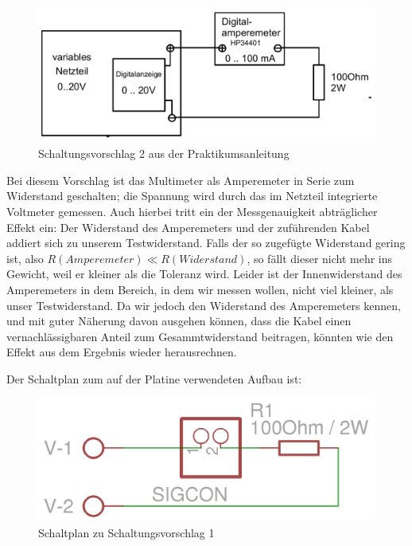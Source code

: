 \begin{figure}[H] %
	\centering
	\includegraphics[width=\linewidth]{versuch1/v1_1_Schaltungsvorschlag2}
	\caption{Schaltungsvorschlag 2 aus der Praktikumsanleitung}
\end{figure}
Bei diesem Vorschlag ist das Multimeter als Amperemeter in Serie zum Widerstand geschalten; die Spannung wird durch das im Netzteil integrierte Voltmeter gemessen. Auch hierbei tritt ein der Messgenauigkeit abträglicher Effekt ein: Der Widerstand des Amperemeters und der zuführenden Kabel addiert sich zu unserem Testwiderstand.
Falls der so zugefügte Widerstand gering ist, also $R(Amperemeter) \ll R(Widerstand)$, so fällt dieser nicht mehr ins Gewicht, weil er kleiner als die Toleranz wird. Leider ist der Innenwiderstand des Amperemeters in dem Bereich, in dem wir messen wollen, nicht viel kleiner, als unser Testwiderstand.
Da wir jedoch den Widerstand des Amperemeters kennen, und mit guter Näherung davon ausgehen können, dass die Kabel einen vernachlässigbaren Anteil zum Gesammtwiderstand beitragen, könnten wie den Effekt aus dem Ergebnis wieder herausrechnen.

Der Schaltplan zum auf der Platine verwendeten Aufbau ist:
\begin{figure}[H] %
	\centering
	\includegraphics[width=\linewidth]{versuch1/versuch1_schaltplan}
	\caption{Schaltplan zu Schaltungsvorschlag 1}
\end{figure}

